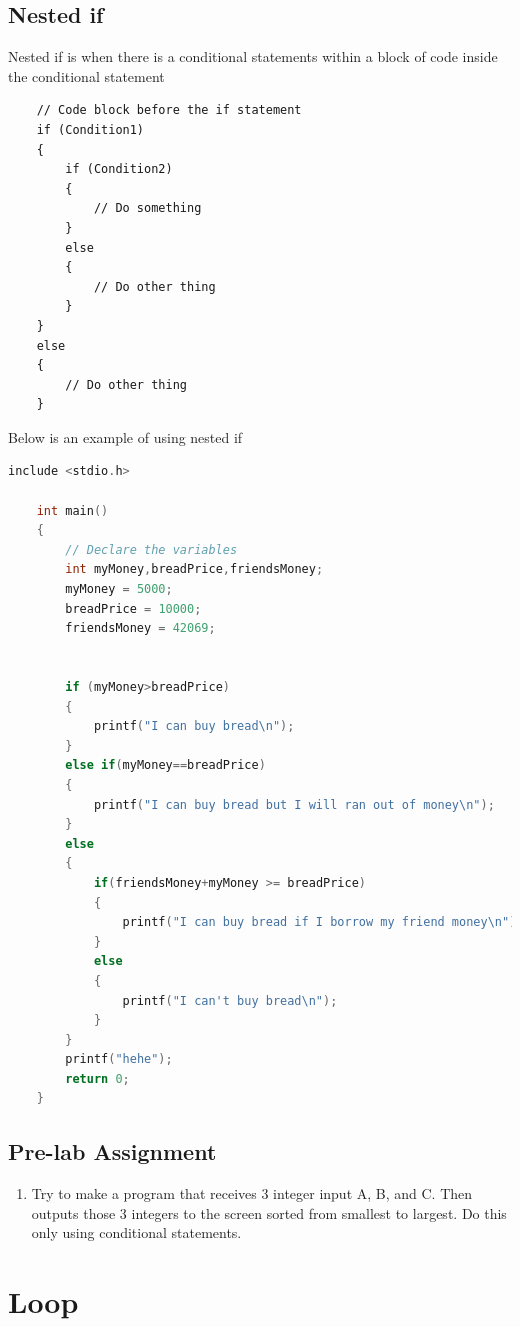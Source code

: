 \subsection{Nested if}
Nested if is when there is a conditional statements within a block of code inside the conditional statement
\begin{verbatim}
	// Code block before the if statement
	if (Condition1) 
	{
		if (Condition2)
		{
			// Do something
		}
		else
		{
			// Do other thing
		}
	} 
	else
	{
		// Do other thing
	}
\end{verbatim}

Below is an example of using nested if

\begin{lstlisting}[language=c,caption = Nested if example,label=lst:nestedifexample01]
	include <stdio.h>
	
	int main()
	{
		// Declare the variables
		int myMoney,breadPrice,friendsMoney;
		myMoney = 5000;
		breadPrice = 10000;
		friendsMoney = 42069;
		
		
		if (myMoney>breadPrice)
		{
		    printf("I can buy bread\n");
		}
		else if(myMoney==breadPrice)
		{
		    printf("I can buy bread but I will ran out of money\n");
		}
		else
		{
		    if(friendsMoney+myMoney >= breadPrice)
		    {
		        printf("I can buy bread if I borrow my friend money\n"); 
		    }
		    else
		    {
	            printf("I can't buy bread\n");	
		    }
		}
		printf("hehe");
		return 0;
	}
\end{lstlisting}


\subsection{Pre-lab Assignment}
\begin{enumerate}
	\item Try to make a program that receives 3 integer input A, B, and C. Then outputs those 3 integers to the screen sorted from smallest to largest. Do this only using conditional statements.
\end{enumerate}

\section{Loop}
